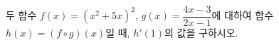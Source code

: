 두 함수 $f(x)=(x^2+5x)^2$, $g(x)=\dfrac{4x-3}{2x-1}$에 대하여 함수 $h(x)=(f\circ g)(x)$일 때, $h'(1)$의 값을 구하시오.
